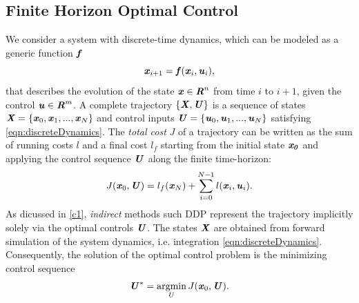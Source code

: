 \subsection{Finite Horizon Optimal Control}
We consider a system with discrete-time dynamics, which can be modeled as a generic function $\bm{\mathit{f}}$
\begin{equation}\label{eqn:discreteDynamics}
\bm{\mathit{x}}_{i+1}=\bm{\mathit{f}}(\bm{\mathit{x}}_i,\bm{\mathit{u}}_i), 
\end{equation}
that describes the evolution of the state $\bm{\mathit{x}}\in \bm{\mathit{R}}^n$ from time $i$ to $i+1$, given the control $\bm{\mathit{u}}\in \bm{\mathit{R}}^m$. A complete trajectory $\{\bm{\mathit{X}}, \bm{\mathit{U}}\}$ is a sequence of states $\bm{\mathit{X}}=\{\bm{\mathit{x}}_0, \bm{\mathit{x}}_1, ..., \bm{\mathit{x}}_N\}$ and control inputs $\bm{\mathit{U}}=\{\bm{\mathit{u}}_0, \bm{\mathit{u}}_1, ..., \bm{\mathit{u}}_N\}$ satisfying \cref{eqn:discreteDynamics}.
The \textit{total cost} $J$ of a trajectory can be written as the sum of running costs $l$ and a final cost $l_f$ starting from the initial state $\bm{\mathit{x_0}}$ and applying the control sequence $\bm{\mathit{U}}$ along the finite time-horizon:     
\begin{equation}\label{eqn:totalCost}
J(\bm{\mathit{x}}_0, \bm{\mathit{U}})=l_f(\bm{\mathit{x}}_N)+\sum_{i=0}^{N-1}l(\bm{\mathit{x}}_i,\bm{\mathit{u}}_i).
\end{equation}
As dicussed in \cref{c1}, \textit{indirect} methods such \gls{DDP} represent the trajectory implicitly solely via the optimal controls $\bm{\mathit{U}}$. The states $\bm{\mathit{X}}$ are obtained from forward simulation of the system dynamics, i.e. integration \cref{eqn:discreteDynamics}. Consequently, the solution of the optimal control problem is the minimizing control sequence 
\begin{equation*}\label{eqn:minControl}
\bm{\mathit{U}}^*=\operatorname*{argmin}_U J(\bm{\mathit{x}}_0, \bm{\mathit{U}}). 
\end{equation*}

